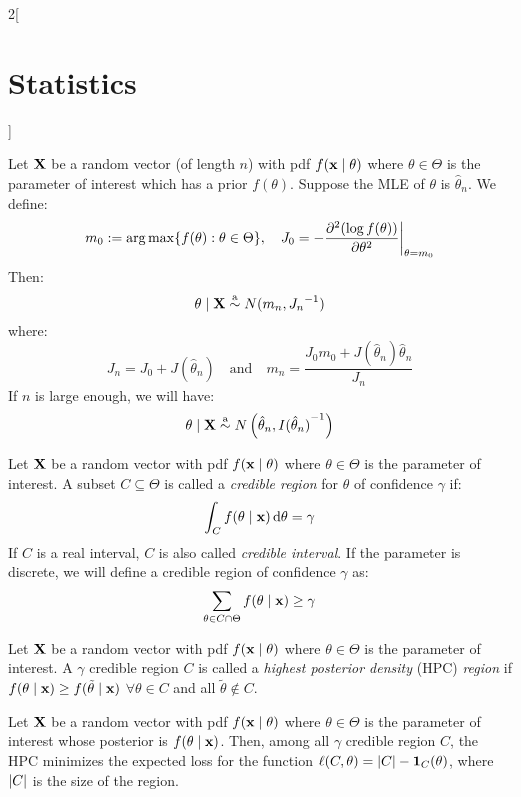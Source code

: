 \documentclass[../../../main.tex]{subfiles}
\begin{document}
\begin{multicols}{2}[\section{Statistics}]
  \begin{theorem}
    Let $\boldsymbol{\mathrm{X}}$ be a random vector (of length $n$) with pdf $f(\boldsymbol{\mathrm{x}}\mid \theta)$ where $\theta\in\Theta$ is the parameter of interest which has a prior $f(\theta)$. Suppose the MLE of $\theta$ is $\hat\theta_n$. We define: $$m_0:=\operatorname*{arg\,max}\{f(\theta):\theta\in\Theta\},\quad J_0=-\pdv[2]{(\log f(\theta))}{\theta}\bigg|_{\theta=m_0}$$ Then: $$\theta\mid\boldsymbol{\mathrm{X}}\overset{\text{a}}{\sim} N(m_n,{J_n}^{-1})$$
    where: $$J_n=J_0+J(\hat\theta_n)\quad\text{and}\quad m_n=\frac{J_0m_0+J(\hat\theta_n)\hat\theta_n}{J_n}$$
    If $n$ is large enough, we will have: $$\theta\mid\boldsymbol{\mathrm{X}}\overset{\text{a}}{\sim} N\left(\hat\theta_n,{I(\hat\theta_n)}^{-1}\right)$$
  \end{theorem}
  \begin{definition}
    Let $\boldsymbol{\mathrm{X}}$ be a random vector with pdf $f(\boldsymbol{\mathrm{x}}\mid \theta)$ where $\theta\in\Theta$ is the parameter of interest. A subset $C\subseteq \Theta$ is called a \emph{credible region} for $\theta$ of confidence $\gamma$ if: $$\int_Cf(\theta\mid\boldsymbol{\mathrm{x}})\dd{\theta}=\gamma$$ If $C$ is a real interval, $C$ is also called \emph{credible interval}. If the parameter is discrete, we will define a credible region of confidence $\gamma$ as: $$\sum_{\theta\in C\cap \Theta}f(\theta\mid\boldsymbol{\mathrm{x}})\geq \gamma$$
  \end{definition}
  \begin{definition}
    Let $\boldsymbol{\mathrm{X}}$ be a random vector with pdf $f(\boldsymbol{\mathrm{x}}\mid \theta)$ where $\theta\in\Theta$ is the parameter of interest. A $\gamma$ credible region $C$ is called a \emph{highest posterior density} (HPC) \emph{region} if $f(\theta\mid\boldsymbol{\mathrm{x}})\geq f(\tilde{\theta}\mid \boldsymbol{\mathrm{x}})$ $\forall \theta\in C$ and all $\tilde{\theta}\notin C$.
  \end{definition}
  \begin{proposition}
    Let $\boldsymbol{\mathrm{X}}$ be a random vector with pdf $f(\boldsymbol{\mathrm{x}}\mid \theta)$ where $\theta\in\Theta$ is the parameter of interest whose posterior is $f(\theta\mid\boldsymbol{\mathrm{x}})$. Then, among all $\gamma$ credible region $C$, the HPC minimizes the expected loss for the function $\ell(C,\theta)=\abs{C}-\boldsymbol{\mathrm{1}}_{C}(\theta)$, where $\abs{C}$ is the size of the region.
  \end{proposition}


\end{multicols}
\end{document}
